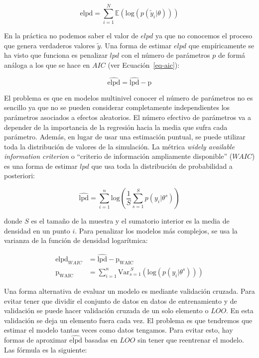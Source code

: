 \documentclass[
  12pt,
  a4paper,
  extrafontsizes,
  onecolumn,
  openright]{memoir}
\begin{document}
\[
\mathrm{elpd} = \sum_{i=1}^{N} \mathbb{E}(\mathrm{log} (p(\tilde{y}_i | \theta)))
\]

En la práctica no podemos saber el valor de \(elpd\) ya que no conocemos
el proceso que genera verdaderos valores \(\tilde{y}\). Una forma de
estimar \(elpd\) que empíricamente se ha visto que funciona es penalizar
\(lpd\) con el número de parámetros \(p\) de formá análoga a los que se
hace en \(AIC\) (ver Ecuación~\ref{eq-aic}):

\[
\widehat{\mathrm{elpd}} = \widehat{\mathrm{lpd}} - \mathrm{p}
\]

El problema es que en modelos multinivel conocer el número de parámetros
no es sencillo ya que no se pueden considerar completamente
independientes los parámetros asociados a efectos aleatorios. El número
efectivo de parámetros va a depender de la importancia de la regresión
hacia la media que sufra cada parámetro. Además, en lugar de usar una
estimación puntual, se puede utilizar toda la distribución de valores de
la simulación. La métrica \emph{widely available information criterion}
o \enquote{criterio de información ampliamente disponible} (\(WAIC\)) es
una forma de estimar \(lpd\) que usa toda la distribución de
probabilidad a posteriori:

\[
\widehat{\mathrm{lpd}} = \sum_{i=1}^{n} \mathrm{log} (\frac{1}{S} \sum_{s=1}^{S} p(y_{i} | \theta^s))
\]

donde \(S\) es el tamaño de la muestra y el sumatorio interior es la
media de densidad en un punto \(i\). Para penalizar los modelos más
complejos, se usa la varianza de la función de densidad logarítmica:

\[
\begin{aligned}
\widehat{\mathrm{elpd}}_{WAIC} &= \widehat{\mathrm{lpd}} - \mathrm{p_{WAIC}} \\
\mathrm{p_{\mathrm{WAIC}}} &= \sum_{i=1}^{n} \mathrm{Var}_{s=1}^{\,S}(\mathrm{log} (p(y_{i} | \theta^s)))
\end{aligned}
\]

Una forma alternativa de evaluar un modelo es mediante validación
cruzada. Para evitar tener que dividir el conjunto de datos en datos de
entrenamiento y de validación se puede hacer validación cruzada de un
solo elemento o \(LOO\). En esta validación se deja un elemento fuera
cada vez. El problema es que tendremos que estimar el modelo tantas
veces como datos tengamos. Para evitar esto, hay formas de aproximar
\(\widehat{\mathrm{elpd}}\) basadas en \(LOO\) sin tener que reentrenar
el modelo. Las fórmula es la siguiente:
\end{document}
